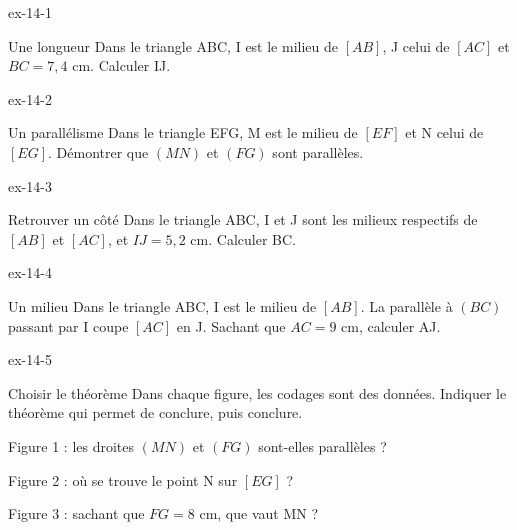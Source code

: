 \clearpage{}
\begin{blocLivre}{ex-14-1}\begin{exercice}[1]{Une longueur}
Dans le triangle ABC, I est le milieu de $[AB]$, J celui de $[AC]$ et $BC=7{,}4$ cm. Calculer IJ.
\label{fig-ex-14-1}
\end{exercice}\end{blocLivre}
\begin{blocLivre}{ex-14-2}\begin{exercice}[1]{Un parallélisme}
Dans le triangle EFG, M est le milieu de $[EF]$ et N celui de $[EG]$. Démontrer que $(MN)$ et $(FG)$ sont parallèles.
\label{fig-ex-14-2}
\end{exercice}\end{blocLivre}
\begin{blocLivre}{ex-14-3}\begin{exercice}[1]{Retrouver un côté}
Dans le triangle ABC, I et J sont les milieux respectifs de $[AB]$ et $[AC]$, et $IJ=5{,}2$ cm. Calculer BC.
\label{fig-ex-14-3}
\end{exercice}\end{blocLivre}
\begin{blocLivre}{ex-14-4}\begin{exercice}[1]{Un milieu}
Dans le triangle ABC, I est le milieu de $[AB]$. La parallèle à $(BC)$ passant par I coupe $[AC]$ en J. Sachant que $AC=9$ cm, calculer AJ.
\label{fig-ex-14-4}
\end{exercice}\end{blocLivre}
\begin{blocLivre}{ex-14-5}\begin{exercice}[1]{Choisir le théorème}
Dans chaque figure, les codages sont des données. Indiquer le théorème qui permet de conclure, puis conclure.\begin{questions}
\item Figure 1 : les droites $(MN)$ et $(FG)$ sont-elles parallèles ?
\item Figure 2 : où se trouve le point N sur $[EG]$ ?
\item Figure 3 : sachant que $FG=8$ cm, que vaut MN ?
\end{questions}
\label{fig-ex-14-5}
\end{exercice}\end{blocLivre}


